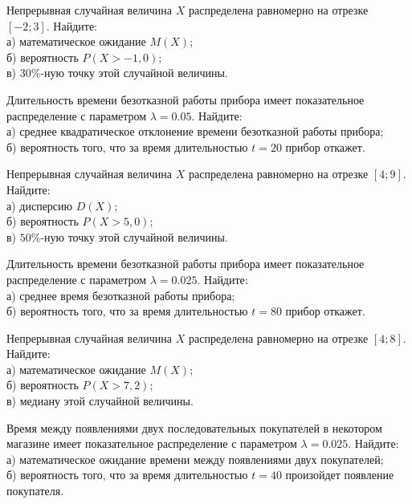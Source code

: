 \vfill

\newpage\setcounter{zad}{0}

\z Непрерывная случайная величина $X$ распределена равномерно на отрезке $[-2; 3]$. Найдите: \\ \quad а) математическое ожидание $M(X)$; \\ \quad б) вероятность $P(X>-1{,}0)$; \\ \quad в) $30\%$-ную точку этой случайной величины.


\vfill

\z Длительность времени безотказной работы прибора имеет показательное распределение с параметром $\lambda = 0.05$. Найдите: \\ \quad а) среднее квадратическое отклонение времени безотказной работы прибора; \\ \quad б) вероятность того, что за время длительностью $t = 20$ прибор  откажет.
 

\vfill

\newpage\setcounter{zad}{0}

\z Непрерывная случайная величина $X$ распределена равномерно на отрезке $[4; 9]$. Найдите: \\ \quad а) дисперсию $D(X)$; \\ \quad б) вероятность $P(X>5{,}0)$; \\ \quad в) $50\%$-ную точку этой случайной величины.


\vfill

\z Длительность времени безотказной работы прибора имеет показательное распределение с параметром $\lambda = 0.025$. Найдите: \\ \quad а) среднее время безотказной работы прибора; \\ \quad б) вероятность того, что за время длительностью $t = 80$ прибор  откажет.
 

\vfill

\newpage\setcounter{zad}{0}

\z Непрерывная случайная величина $X$ распределена равномерно на отрезке $[4; 8]$. Найдите: \\ \quad а) математическое ожидание $M(X)$; \\ \quad б) вероятность $P(X>7{,}2)$; \\ \quad в) медиану этой случайной величины.


\vfill

\z Время между появлениями двух последовательных покупателей в некотором магазине имеет показательное распределение с параметром $\lambda = 0.025$. Найдите: \\ \quad а) математическое ожидание времени между появлениями двух покупателей; \\ \quad б) вероятность того, что за время длительностью $t = 40$  произойдет появление покупателя.
 

\vfill

\newpage\setcounter{zad}{0}